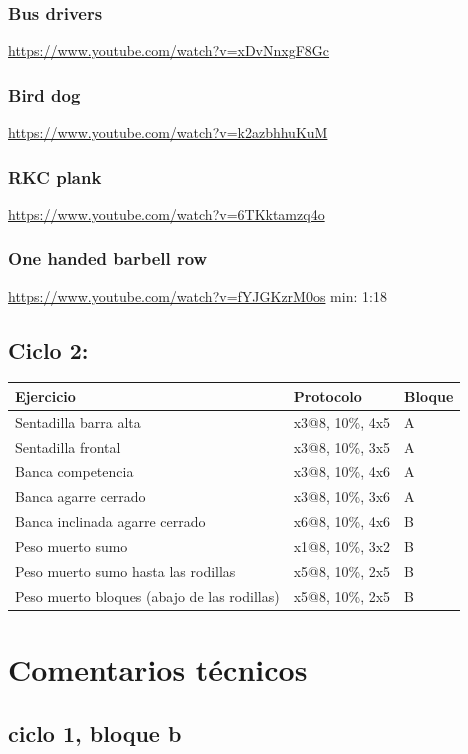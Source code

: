 \documentclass[11pt]{article}
\begin{document}
\subsubsection{Bus drivers}
\label{sec:org0f06946}
\url{https://www.youtube.com/watch?v=xDvNnxgF8Gc}
\subsubsection{Bird dog}
\label{sec:orgdb6f828}
\url{https://www.youtube.com/watch?v=k2azbhhuKuM}
\subsubsection{RKC plank}
\label{sec:org93b04ec}
\url{https://www.youtube.com/watch?v=6TKktamzq4o}
\subsubsection{One handed barbell row}
\label{sec:orgb6ae7dc}
\url{https://www.youtube.com/watch?v=fYJGKzrM0os} min: 1:18

\subsection{Ciclo 2:}
\label{sec:org3eed3e7}
\begin{center}
\begin{tabular}{lll}
Ejercicio & Protocolo & Bloque\\
\hline
Sentadilla barra alta & x3@8, 10\%, 4x5 & A\\
Sentadilla frontal & x3@8, 10\%, 3x5 & A\\
Banca competencia & x3@8, 10\%, 4x6 & A\\
Banca agarre cerrado & x3@8, 10\%, 3x6 & A\\
\hline
Banca inclinada agarre cerrado & x6@8, 10\%, 4x6 & B\\
Peso muerto sumo & x1@8, 10\%, 3x2 & B\\
Peso muerto sumo hasta las rodillas & x5@8, 10\%, 2x5 & B\\
Peso muerto bloques (abajo de las rodillas) & x5@8, 10\%, 2x5 & B\\
\hline
\end{tabular}
\end{center}
\section{Comentarios técnicos}
\label{sec:org4cde17b}
\subsection{ciclo 1, bloque b}
\label{sec:orgaec56ab}
\end{document}
